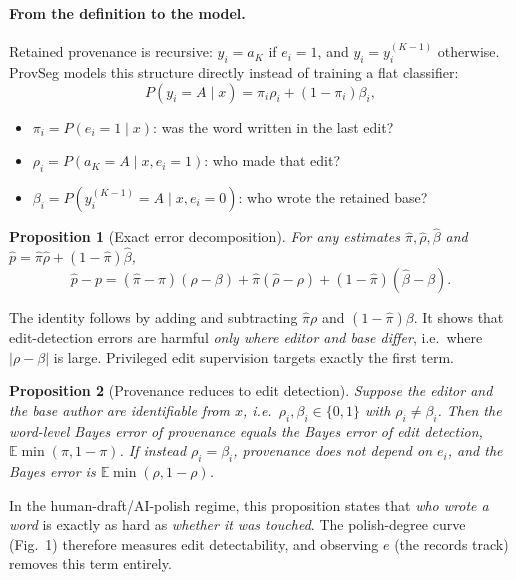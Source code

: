 \documentclass[10pt]{article}
\newtheorem{proposition}{Proposition}
\begin{document}
\paragraph{From the definition to the model.} Retained provenance is recursive: $y_i=a_K$ if $e_i=1$, and $y_i=y_i^{(K-1)}$ otherwise. ProvSeg models this structure directly instead of training a flat classifier:
\begin{equation}
P(y_i{=}A\mid x)=\pi_i\rho_i+(1-\pi_i)\beta_i,
\label{eq:efp}
\end{equation}
\begin{itemize}
\item $\pi_i=P(e_i{=}1\mid x)$: was the word written in the last edit?
\item $\rho_i=P(a_K{=}A\mid x,e_i{=}1)$: who made that edit?
\item $\beta_i=P(y^{(K-1)}_i{=}A\mid x,e_i{=}0)$: who wrote the retained base?
\end{itemize}

\begin{proposition}[Exact error decomposition]\label{prop:dec}
For any estimates $\hat\pi,\hat\rho,\hat\beta$ and $\hat p=\hat\pi\hat\rho+(1-\hat\pi)\hat\beta$,
\[\hat p-p=(\hat\pi-\pi)(\rho-\beta)+\hat\pi(\hat\rho-\rho)+(1-\hat\pi)(\hat\beta-\beta).\]
\end{proposition}
\noindent The identity follows by adding and subtracting $\hat\pi\rho$ and $(1-\hat\pi)\beta$. It shows that edit-detection errors are harmful \emph{only where editor and base differ}, i.e.\ where $|\rho-\beta|$ is large. Privileged edit supervision targets exactly the first term.

\begin{proposition}[Provenance reduces to edit detection]\label{prop:red}
Suppose the editor and the base author are identifiable from $x$, i.e.\ $\rho_i,\beta_i\in\{0,1\}$ with $\rho_i\neq\beta_i$. Then the word-level Bayes error of provenance equals the Bayes error of edit detection, $\mathbb{E}\min(\pi,1-\pi)$. If instead $\rho_i=\beta_i$, provenance does not depend on $e_i$, and the Bayes error is $\mathbb{E}\min(\rho,1-\rho)$.
\end{proposition}
\noindent In the human-draft/AI-polish regime, this proposition states that \emph{who wrote a word} is exactly as hard as \emph{whether it was touched}. The polish-degree curve (Fig.~1) therefore measures edit detectability, and observing $e$ (the records track) removes this term entirely.
\end{document}
